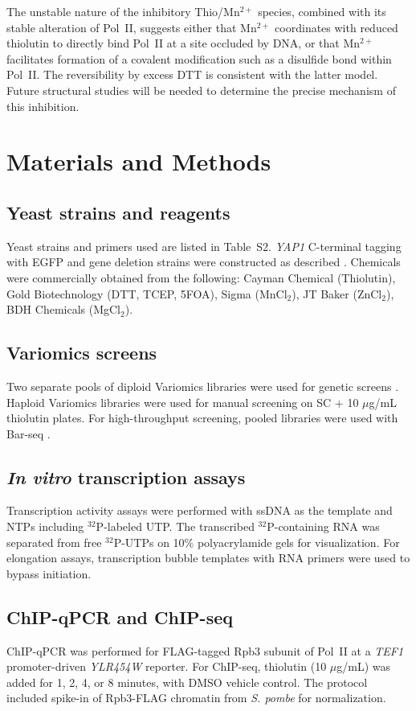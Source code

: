 \documentclass[11pt]{article}
\begin{document}
The unstable nature of the inhibitory Thio/Mn$^{2+}$ species, combined with its stable alteration of Pol~II, suggests either that Mn$^{2+}$ coordinates with reduced thiolutin to directly bind Pol~II at a site occluded by DNA, or that Mn$^{2+}$ facilitates formation of a covalent modification such as a disulfide bond within Pol~II. The reversibility by excess DTT is consistent with the latter model. Future structural studies will be needed to determine the precise mechanism of this inhibition.

\section{Materials and Methods}

\subsection{Yeast strains and reagents}
Yeast strains and primers used are listed in Table~S2. \textit{YAP1} C-terminal tagging with EGFP and gene deletion strains were constructed as described \citep{janke2004,longtine1998}. Chemicals were commercially obtained from the following: Cayman Chemical (Thiolutin), Gold Biotechnology (DTT, TCEP, 5FOA), Sigma (MnCl$_2$), JT Baker (ZnCl$_2$), BDH Chemicals (MgCl$_2$).

\subsection{Variomics screens}
Two separate pools of diploid Variomics libraries were used for genetic screens \citep{pan2006}. Haploid Variomics libraries were used for manual screening on SC + 10 $\mu$g/mL thiolutin plates. For high-throughput screening, pooled libraries were used with Bar-seq \citep{smith2009,lee2014}.

\subsection{\textit{In vitro} transcription assays}
Transcription activity assays were performed with ssDNA as the template and NTPs including $^{32}$P-labeled UTP. The transcribed $^{32}$P-containing RNA was separated from free $^{32}$P-UTPs on 10\% polyacrylamide gels for visualization. For elongation assays, transcription bubble templates with RNA primers were used to bypass initiation.

\subsection{ChIP-qPCR and ChIP-seq}
ChIP-qPCR was performed for FLAG-tagged Rpb3 subunit of Pol~II at a \textit{TEF1} promoter-driven \textit{YLR454W} reporter. For ChIP-seq, thiolutin (10 $\mu$g/mL) was added for 1, 2, 4, or 8 minutes, with DMSO vehicle control. The protocol included spike-in of Rpb3-FLAG chromatin from \textit{S. pombe} for normalization.
\end{document}
